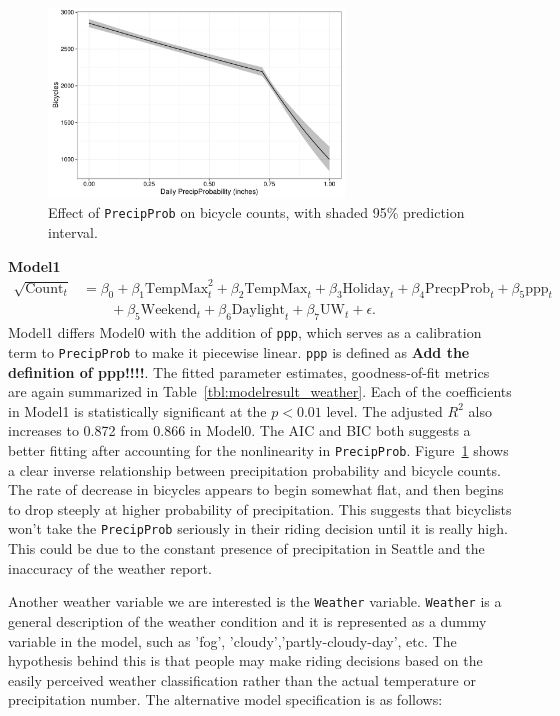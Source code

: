 \documentclass [11pt, proquest] {uwthesis}[2015/03/03]
\begin{document}
\begin{figure}
\centering
   \includegraphics[width=0.7\textwidth]{figures/sim/precip} 
  \caption{Effect of \texttt{PrecipProb} on bicycle counts, with shaded 95\% prediction interval.}
  \label{fig:precip}
\end{figure}

\textbf{Model1}
\begin{align}
\sqrt{\text{Count}_t} &= \beta_0 + \beta_1 \text{TempMax}^2_t + \beta_2 \text{TempMax}_t + \beta_3 \text{Holiday}_t + \beta_4 \text{PrecpProb}_t + \beta_5 \text{ppp}_t  \nonumber\\
&\qquad + \beta_5 \text{Weekend}_t + \beta_6 \text{Daylight}_t + \beta_7 \text{UW}_t + \epsilon.\label{eqref:model1}
\end{align}
Model1 differs Model0 with the addition of \texttt{ppp}, which serves as a calibration term to \texttt{PrecipProb} to make it piecewise linear. \texttt{ppp} is defined as \textbf{Add the definition of ppp!!!!}. The fitted parameter estimates, goodness-of-fit metrics are again summarized in Table~\ref{tbl:modelresult_weather}. Each of the coefficients in Model1 is statistically significant at the $p<0.01$ level. The adjusted $R^2$ also increases to 0.872 from 0.866 in Model0. The AIC and BIC both suggests a better fitting after accounting for the nonlinearity in \texttt{PrecipProb}. Figure~\ref{fig:precip} shows a clear inverse relationship between precipitation probability and bicycle counts. The rate of decrease in bicycles appears to begin somewhat flat, and then begins to drop steeply at higher probability of precipitation. This suggests that bicyclists won't take the \texttt{PrecipProb} seriously in their riding decision until it is really high. This could be due to the constant presence of precipitation in Seattle and the inaccuracy of the weather report.

Another weather variable we are interested is the \texttt{Weather} variable. \texttt{Weather} is a general description of the weather condition and it is represented as a dummy variable in the model, such as 'fog', 'cloudy','partly-cloudy-day', etc. The hypothesis behind this is that people may make riding decisions based on the easily perceived weather classification rather than the actual temperature or precipitation number. The alternative model specification is as follows:
\end{document}
